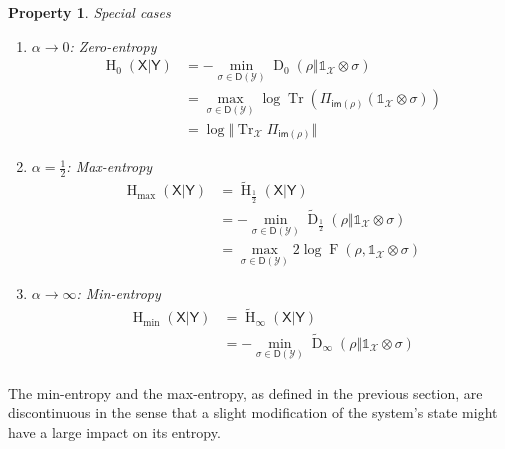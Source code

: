 \documentclass[aps,pra,onecolumn,notitlepage,superscriptaddress]{revtex4-1}
\newcommand{\reg}[1]{\mathsf{#1}}
\newcommand{\spc}[1]{\mathcal{#1}}
\newcommand{\D}{\mathsf{D}}
\newcommand{\im}{\mathsf{im}}
\newcommand{\Tr}{\operatorname{Tr}}
\newcommand{\op}[1]{\operatorname{#1}}
\newcommand\I{\mathds{1}}
\newtheorem{proper}{Property}
\begin{document}
    \begin{proper}
        Special cases
        \begin{enumerate}
            \item $\alpha \to 0$: Zero-entropy
            \begin{align*}
                \op H_0(\reg X | \reg Y) 
                &= - \min_{\sigma \in \D(\spc Y)} \op D_0(\rho \Vert \I_\spc X \otimes \sigma) \\
                &= \max_{\sigma \in \D(\spc Y)} \log \Tr(\Pi_{\im(\rho)}(\I_\spc X \otimes \sigma)) \\
                &= \log \Vert \Tr_\spc X \Pi_{\im(\rho)} \Vert
            \end{align*}

            \item $\alpha = \frac 1 2$: Max-entropy
                \begin{align*}
                    \op H_{\max}(\reg X | \reg Y) 
                    &= \widetilde{\op H}_{\frac 1 2}(\reg X | \reg Y) \\
                    &= - \min_{\sigma \in \D(\spc Y)} \widetilde{\op D}_{\frac 1 2}(\rho \Vert \I_\spc X \otimes \sigma) \\
                    &= \max_{\sigma \in \D(\spc Y)} 2 \log \op F(\rho, \I_\spc X \otimes \sigma)
                \end{align*}

            \item $\alpha \to \infty$: Min-entropy
            \begin{align*}
                \op H_{\min}(\reg X | \reg Y)
                &= \widetilde{\op H}_{\infty}(\reg X | \reg Y) \\
                &= - \min_{\sigma \in \D(\spc Y)} \widetilde{\op D}_{\infty}(\rho \Vert \I_\spc X \otimes \sigma) \\
            \end{align*}
        \end{enumerate}
    \end{proper}

    The min-entropy and the max-entropy, as defined in the previous section, are discontinuous in the sense that a slight modification of the system's state might have a large impact on its entropy.
\end{document}
